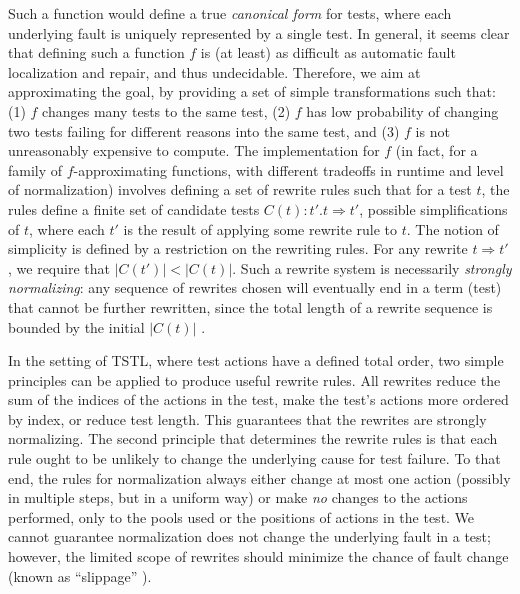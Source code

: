 Such a function would define a true \emph{canonical form} for tests, where each underlying fault is uniquely represented by a single
test.  In general, it seems clear that defining such a function
$f$ is (at least) as difficult as automatic fault localization and
repair, and thus undecidable.  Therefore, we aim at approximating the
goal, by providing a set of simple transformations such that: (1) $f$
changes many tests to the same test, (2) $f$ has low probability of
changing two tests failing for different reasons into the same test,
and (3) $f$ is not unreasonably expensive to compute.  The implementation
for $f$ (in fact, for a family of $f$-approximating functions, with
different tradeoffs in runtime and level of normalization) involves
defining a set of rewrite rules such that for a test $t$, the rules
define a finite set of candidate tests $C(t): t' . t \Rightarrow t'$, possible
simplifications of $t$, where each $t'$ is the result of applying some
rewrite rule to $t$.  The notion of simplicity is defined by a
restriction on the rewriting rules.  For any rewrite $t \Rightarrow t'$, we require that $|C(t')| < |C(t)|$.  Such
a rewrite system is necessarily \emph{strongly normalizing}: any
sequence of rewrites chosen will eventually end in a term (test)
that cannot be further rewritten, since the total length of a rewrite
sequence is bounded by the initial $|C(t)|$ \cite{term1}.


In the setting of TSTL, where test actions have a defined total
order, two simple principles can be applied to produce useful
rewrite rules.  All rewrites reduce the sum of the
indices of the actions in the test, make the test's
actions more ordered by index, or reduce test length.  This guarantees that the rewrites are
strongly normalizing.
The second principle that determines the rewrite rules is that each
rule ought to be unlikely to change the underlying cause for test
failure.  To that end, the rules for normalization always either change at most
one action (possibly in multiple steps, but in a uniform way) or make
\emph{no} changes to the actions performed, only to the pools used or the
positions of actions in the test.  We cannot guarantee
normalization does not change the underlying fault in a test; however,
the limited scope of rewrites should minimize the chance of fault
change (known as ``slippage'' \cite{PLDI13,slippage}).

